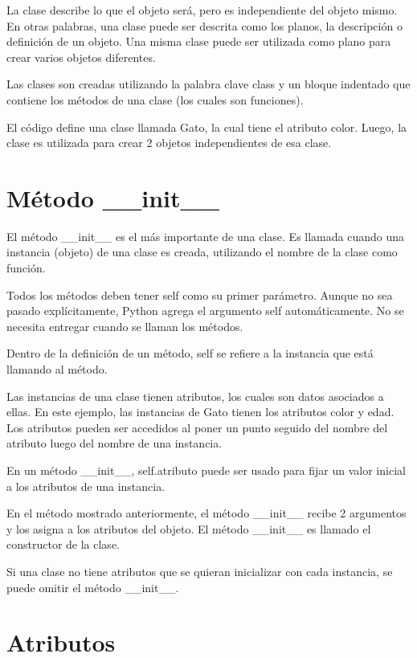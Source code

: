 \documentclass{report}
\begin{document}
La clase describe lo que el objeto será, pero es independiente del objeto mismo. En otras palabras, una clase puede ser descrita como los planos, la descripción o definición de un objeto. Una misma clase puede ser utilizada como plano para crear varios objetos diferentes.

Las clases son creadas utilizando la palabra clave class y un bloque indentado que contiene los métodos de una clase (los cuales son funciones).


El código define una clase llamada Gato, la cual tiene el atributo color. Luego, la clase es utilizada para crear 2 objetos independientes de esa clase.

\section{Método \_\_init\_\_}

El método \_\_init\_\_ es el más importante de una clase. Es llamada cuando una instancia (objeto) de una clase es creada, utilizando el nombre de la clase como función.

Todos los métodos deben tener self como su primer parámetro. Aunque no sea pasado explícitamente, Python agrega el argumento self automáticamente. No se necesita entregar cuando se llaman los métodos.

Dentro de la definición de un método, self se refiere a la instancia que está llamando al método.

Las instancias de una clase tienen atributos, los cuales son datos asociados a ellas. En este ejemplo, las instancias de Gato tienen los atributos color y edad. Los atributos pueden ser accedidos al poner un punto seguido del nombre del atributo luego del nombre de una instancia.


En un método \_\_init\_\_, self.atributo puede ser usado para fijar un valor inicial a los atributos de una instancia.

En el método mostrado anteriormente, el método \_\_init\_\_ recibe 2 argumentos y los asigna a los atributos del objeto. El método \_\_init\_\_ es llamado el constructor de la clase.

Si una clase no tiene atributos que se quieran inicializar con cada instancia, se puede omitir el método \_\_init\_\_.



\section{Atributos}
\end{document}
